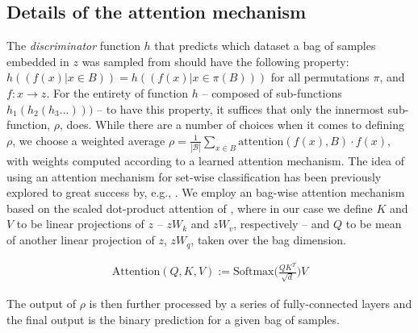 \subsection{Details of the attention mechanism}\label{ssec:attention-mechanism}
%
The \emph{discriminator} function $h$ that predicts which dataset a bag of samples embedded in $z$
was sampled from should have the following property: \( h((f(x) | x \in B)) = h((f(x) | x \in \pi
(B))) \) for all permutations $\pi$, and $f: x \to z$. 
%
For the entirety of function $h$ -- composed of sub-functions \( h_1(h_2(h_3...))) \) -- to have this
property, it suffices that only the innermost sub-function, $\rho$, does. 
%
While there are a number of choices when it comes to defining $\rho$, we choose a weighted average
$\rho = \frac{1}{|\mathcal{B}|} \sum_{x \in B}\mathrm{attention}(f(x), B) \cdot f(x)$, with weights
computed according to a learned attention mechanism. 
%
The idea of using an attention mechanism for set-wise classification has been previously explored
to great success by, e.g., \citet{lee2019set}. %
%
We employ an bag-wise attention mechanism based on the scaled dot-product attention of
\citet{vaswani2017attention}, where in our case we define $K$ and $V$ to be linear projections of
$z$ -- $zW_k$ and $zW_v$, respectively -- and $Q$ to be mean of another linear projection of $z$,
$zW_q$, taken over the bag dimension.

\begin{align*}
  \text{Attention}(\mathit{Q}, \mathit{K}, \mathit{V}) := \text{Softmax} \biggl( \frac{ \mathit{Q}
  \mathit{K}^T  } { \sqrt{d} } \biggr) V
\end{align*}

The output of $\rho$ is then further processed by a series of fully-connected layers and the final
output is the binary prediction for a given bag of samples.

